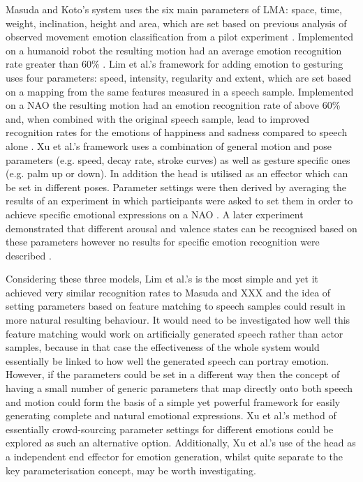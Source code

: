 \documentclass[11pt]{article}
\begin{document}
Masuda and Koto's system uses the six main parameters of LMA: space, time, weight, inclination, height and area, which are set based on previous analysis of observed movement emotion classification from a pilot experiment \cite{masuda2009emotion}. Implemented on a humanoid robot the resulting motion had an average emotion recognition rate greater than 60\% \cite{masuda2010motion}. Lim et al.'s framework for adding emotion to gesturing uses four parameters: speed, intensity, regularity and extent, which are set based on a mapping from the same features measured in a speech sample. Implemented on a NAO the resulting motion had an emotion recognition rate of above 60\% and, when combined with the original speech sample, lead to improved recognition rates for the emotions of happiness and sadness compared to speech alone \cite{lim2011converting}. Xu et al.'s framework uses a combination of general motion and pose parameters (e.g. speed, decay rate, stroke curves) as well as gesture specific ones (e.g. palm up or down). In addition the head is utilised as an effector which can be set in different poses. Parameter settings were then derived by averaging the results of an experiment in which participants were asked to set them in order to achieve specific emotional expressions on a NAO \cite{xu2013mood}. A later experiment demonstrated that different arousal and valence states can be recognised based on these parameters however no results for specific emotion recognition were described \cite{xu2013bodily}.

Considering these three models, Lim et al.'s is the most simple and yet it achieved very similar recognition rates to Masuda and XXX and the idea of setting parameters based on feature matching to speech samples could result in more natural resulting behaviour. It would need to be investigated how well this feature matching would work on artificially generated speech rather than actor samples, because in that case the effectiveness of the whole system would essentially be linked to how well the generated speech can portray emotion. However, if the parameters could be set in a different way then the concept of having a small number of generic parameters that map directly onto both speech and motion could form the basis of a simple yet powerful framework for easily generating complete and natural emotional expressions. Xu et al.'s method of essentially crowd-sourcing parameter settings for different emotions could be explored as such an alternative option. Additionally, Xu et al.'s use of the head as a independent end effector for emotion generation, whilst quite separate to the key parameterisation concept, may be worth investigating. 
\end{document}
